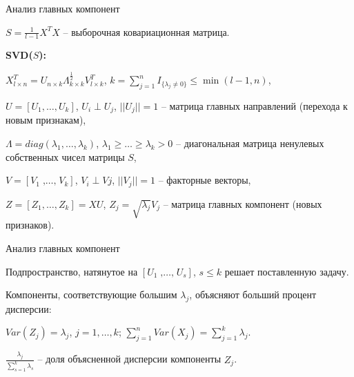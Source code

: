 \documentclass[unicode, notheorems, pdf]{beamer}
\DeclareMathOperator*{\cdc}{,\dots,}
\begin{document}
\begin{frame}{Анализ главных компонент}
	
	$S=\frac{1}{l-1}X^TX$ -- выборочная ковариационная матрица.

	\vspace{.5cm}
	\textbf{SVD($S$):}

	$X_{l \times n}^T = U_{n \times k} \Lambda_{k \times k}^{\frac{1}{2}} V_{l \times k}^T$, $\displaystyle k = \sum_{j=1}^n I_{\{\lambda_j \not= 0\}} \le \min(l-1,n)$,

	\pause
	$U=[U_1,\dots,U_k]$, $U_{i} \perp U_{j}$, $||U_j||=1$ -- матрица главных направлений (перехода к новым признакам),

	$\Lambda = diag(\lambda_1,\dots,\lambda_k)$, $\lambda_1\ge\dots\ge\lambda_k>0$ -- диагональная матрица ненулевых собственных чисел матрицы $S$,

	$V = [V_1 \cdc V_k]$, $V_{i} \perp V{j}$, $||V_j||=1$ -- факторные векторы,

	\vspace{.5cm}
	$Z = [Z_1,\dots,Z_k] = X U$, $Z_j = \sqrt{\lambda_j} V_j$ -- матрица главных компонент (новых признаков).
\end{frame}
%
\begin{frame}{Анализ главных компонент}

	Подпространство, натянутое на $[U_1 \cdc U_s]$, $s \le k$ решает поставленную задачу.

	\vspace{1cm}

	Компоненты, соответствующие большим $\lambda_j$, объясняют больший процент дисперсии:

	$Var(Z_j) = \lambda_j$, $j=1,\dots,k$; $\displaystyle\sum_{j=1}^{n}Var(X_j) = \sum_{j=1}^{k}\lambda_j$.

	$\displaystyle\frac{\lambda_j}{\sum_{s=1}^{k}\lambda_s}$ -- доля объясненной дисперсии компоненты $Z_j$.
\end{frame}
%
\end{document}

